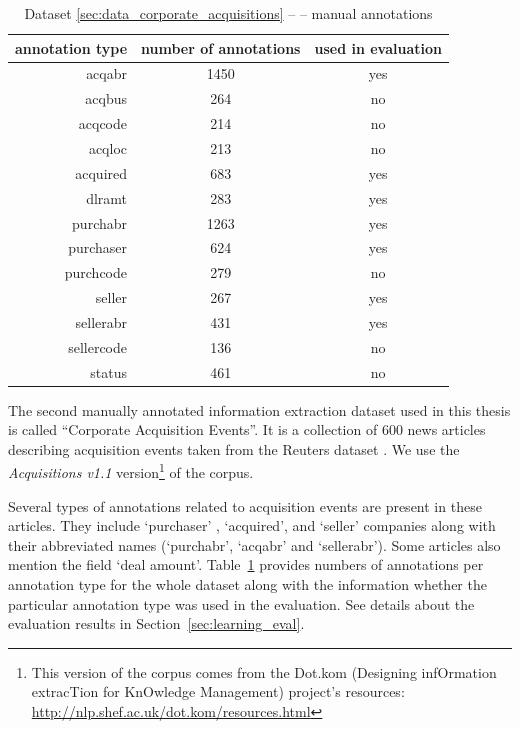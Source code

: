\begin{table}
\centering
\begin{tabular}{|r||c|c|}
\hline
\textbf{annotation type} & \textbf{number of annotations} & \textbf{used in evaluation}\\
\hline
\hline
acqabr & 1450 & yes\\
\hline
acqbus & 264 & no\\
\hline
acqcode & 214 & no\\
\hline
acqloc & 213 & no\\
\hline
acquired & 683 & yes\\
\hline
dlramt & 283 & yes\\
\hline
purchabr & 1263 & yes\\
\hline
purchaser & 624 & yes\\
\hline
purchcode & 279 & no\\
\hline
seller & 267 & yes\\
\hline
sellerabr & 431 & yes\\
\hline
sellercode & 136 & no\\
\hline
status & 461 & no\\
\hline
\end{tabular}
\caption{Dataset \ref{sec:data_corporate_acquisitions} --  -- manual annotations} \label{tab:data_acquisitions}
\end{table}


The second manually annotated information extraction dataset used in this thesis is called ``Corporate Acquisition Events''. 
It is a collection of 600 news articles describing acquisition events taken from the Reuters dataset \citep{lewis1992representation}.
We use the \emph{Acquisitions v1.1} version\footnote{This version of the corpus comes from the Dot.kom (Designing infOrmation extracTion for KnOwledge Management) project's resources: \url{http://nlp.shef.ac.uk/dot.kom/resources.html}} of the corpus.

Several types of annotations related to acquisition events are present in these articles. They include `purchaser' , `acquired', and
`seller' companies along with their abbreviated names (`purchabr', `acqabr' and
`sellerabr'). Some articles also mention the field `deal amount'. 
Table~\ref{tab:data_acquisitions} provides numbers of annotations per annotation type for the whole dataset along with the information whether the particular annotation type was used in the evaluation. See details about the evaluation results in Section~\ref{sec:learning_eval}. 

